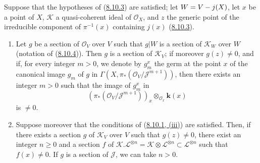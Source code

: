 \begin{corollary}[8.10.5]
\label{II.8.10.5}
Suppose that the hypotheses of \textup{(\hyperref[II.8.10.3]{8.10.3})} are
satisfied; let $W=V- j(X)$, let $x$ be a point of $X$, $\mathcal{K}$ a
quasi-coherent ideal of $\mathcal{O}_X$, and $z$ the generic point of the
irreducible component of $\pi^{-1}(x)$ containing $j(x)$
\textup{(\hyperref[II.8.10.3]{8.10.3})}.
\begin{enumerate}
  \item[\rm{(i)}] Let $g$ be a section of $\mathcal{O}_V$ over $V$
  such that $g|W$ is a section of $\mathcal{K}_W$ over $W$
  (notation of \textup{(\hyperref[II.8.10.4]{8.10.4})}). Then $g$ is a section
  of $\mathcal{K}_V$; if moreover $g(z)\neq0$, and if, for every integer
  $m>0$, we denote by $g_m^x$ the germ at the point $x$ of the canonical
  image $g_m$ of $g$ in
  $\Gamma(X,\pi_*(\mathcal{O}_V/\mathcal{J}^{m+1}))$, then there exists an
  integer $m>0$ such that the image of $g_m^x$ in
  \[
    (\pi_*(\mathcal{O}_V/\mathcal{J}^{m+1}))_x
    \otimes_{\mathcal{O}_x}\boldsymbol{k}(x)
  \]
  is $\neq0$.
  \item[\rm{(ii)}] Suppose moreover that the conditions of
  \textup{(\hyperref[II.8.10.1]{8.10.1, (iii)})} are satisfied. Then, if there exists
  a section $g$ of $\mathcal{K}_V$ over $V$ such that $g(z)\neq0$,
  there exist an integer $n\geqslant0$ and a section $f$ of
  $\mathcal{K}.\mathcal{L}^{\otimes n}=
  \mathcal{K}\otimes\mathcal{L}^{\otimes n}\subset\mathcal{L}^{\otimes n}$
  such that $f(x)\neq0$. If $g$ is a section of $\mathcal{J}$, we can
  take $n>0$.
\end{enumerate}
\end{corollary}

